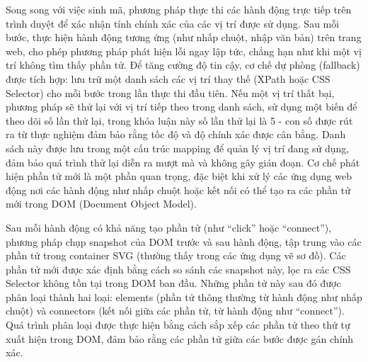 \documentclass[a4paper, 12pt]{report}
\begin{document}
{Song song với việc sinh mã, phương pháp thực thi các hành động trực tiếp trên trình duyệt để xác nhận tính chính xác của các vị trí được sử dụng. Sau mỗi bước, thực hiện hành động tương ứng (như nhấp chuột, nhập văn bản) trên trang web, cho phép phương pháp phát hiện lỗi ngay lập tức, chẳng hạn như khi một vị trí không tìm thấy phần tử. Để tăng cường độ tin cậy, cơ chế dự phòng (fallback) được tích hợp: lưu trữ một danh sách các vị trí thay thế (XPath hoặc CSS Selector) cho mỗi bước trong lần thực thi đầu tiên. Nếu một vị trí thất bại, phương pháp sẽ thử lại với vị trí tiếp theo trong danh sách, sử dụng một biến để theo dõi số lần thử lại, trong khóa luận này số lần thử lại là 5 - con số được rút ra từ thực nghiệm đảm bảo rằng tốc độ và độ chính xác được cân bằng. Danh sách này được lưu trong một cấu trúc mapping để quản lý vị trí đang sử dụng, đảm bảo quá trình thử lại diễn ra mượt mà và không gây gián đoạn.
Cơ chế phát hiện phần tử mới là một phần quan trọng, đặc biệt khi xử lý các ứng dụng web động nơi các hành động như nhấp chuột hoặc kết nối có thể tạo ra các phần tử mới trong DOM (Document Object Model). 




Sau mỗi hành động có khả năng tạo phần tử (như ``click'' hoặc ``connect''), phương pháp chụp snapshot của DOM trước và sau hành động, tập trung vào các phần tử  trong container SVG (thường thấy trong các ứng dụng vẽ sơ đồ). Các phần tử mới được xác định bằng cách so sánh các snapshot này, lọc ra các CSS Selector không tồn tại trong DOM ban đầu. Những phần tử này sau đó được phân loại thành hai loại: elements (phần tử thông thường từ hành động như nhấp chuột) và connectors (kết nối giữa các phần tử, từ hành động như ``connect''). Quá trình phân loại được thực hiện bằng cách sắp xếp các phần tử theo thứ tự xuất hiện trong DOM, đảm bảo rằng các phần tử giữa các bước được gán chính xác.


}
\end{document}
